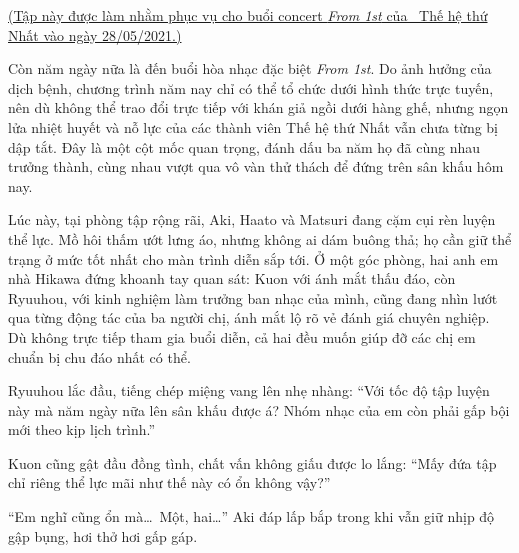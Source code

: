 \documentclass[../main.tex]{subfiles}
\begin{document}

\begin{center}
  \uline{(Tập này được làm nhằm phục vụ cho buổi concert \textit{From 1st} của \hll\ Thế hệ thứ Nhất vào ngày 28/05/2021.)}
\end{center}

Còn năm ngày nữa là đến buổi hòa nhạc đặc biệt \textit{From 1st}. Do ảnh hưởng của dịch bệnh, chương trình năm nay chỉ có thể tổ chức dưới hình thức trực tuyến, nên dù không thể trao đổi trực tiếp với khán giả ngồi dưới hàng ghế, nhưng ngọn lửa nhiệt huyết và nỗ lực của các thành viên Thế hệ thứ Nhất vẫn chưa từng bị dập tắt. Đây là một cột mốc quan trọng, đánh dấu ba năm họ đã cùng nhau trưởng thành, cùng nhau vượt qua vô vàn thử thách để đứng trên sân khấu hôm nay.

Lúc này, tại phòng tập rộng rãi, Aki, Haato và Matsuri đang cặm cụi rèn luyện thể lực. Mồ hôi thấm ướt lưng áo, nhưng không ai dám buông thả; họ cần giữ thể trạng ở mức tốt nhất cho màn trình diễn sắp tới. Ở một góc phòng, hai anh em nhà Hikawa đứng khoanh tay quan sát: Kuon với ánh mắt thấu đáo, còn Ryuuhou, với kinh nghiệm làm trưởng ban nhạc của mình, cũng đang nhìn lướt qua từng động tác của ba người chị, ánh mắt lộ rõ vẻ đánh giá chuyên nghiệp. Dù không trực tiếp tham gia buổi diễn, cả hai đều muốn giúp đỡ các chị em chuẩn bị chu đáo nhất có thể.


Ryuuhou lắc đầu, tiếng chép miệng vang lên nhẹ nhàng: ``Với tốc độ tập luyện này mà năm ngày nữa lên sân khấu được á? Nhóm nhạc của em còn phải gấp bội mới theo kịp lịch trình.''

Kuon cũng gật đầu đồng tình, chất vấn không giấu được lo lắng: ``Mấy đứa tập chỉ riêng thể lực mãi như thế này có ổn không vậy?''

``Em nghĩ cũng ổn mà\dots\ Một, hai\dots'' Aki đáp lấp bắp trong khi vẫn giữ nhịp độ gập bụng, hơi thở hơi gấp gáp.
\end{document}
